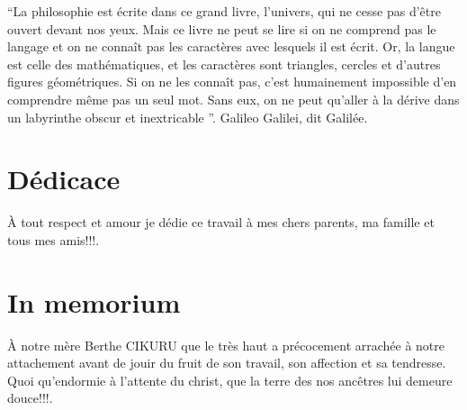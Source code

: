 \documentclass[11pt,a4paper,oneside]{book}
\begin{document}
 
 \par\textquotedblleft La philosophie est écrite dans ce grand livre, l'univers, qui ne cesse pas d'être ouvert devant nos yeux. Mais ce livre ne peut se lire si on ne comprend pas le langage et on ne connaît pas les caractères avec lesquels il est écrit. Or, la langue est celle des mathématiques, et les caractères sont triangles, cercles et d'autres figures géométriques. Si on ne les connaît pas, c'est humainement impossible d'en comprendre même pas un seul mot. Sans eux, on ne peut qu'aller à la dérive dans un labyrinthe obscur et  inextricable \textquotedblright. Galileo Galilei, dit Galilée.
 

\chapter*{Dédicace}
\begin{center}
À tout respect et amour je dédie ce travail à mes chers parents, ma famille et tous mes amis!!!.
\end{center}

\chapter*{In memorium}
\begin{center}
À notre mère Berthe CIKURU que le très haut a précocement arrachée à notre attachement avant de jouir du fruit de son travail, son affection et sa tendresse. Quoi qu’endormie à l’attente du christ, que la terre des nos ancêtres lui demeure douce!!!.
\end{center}
\end{document}
